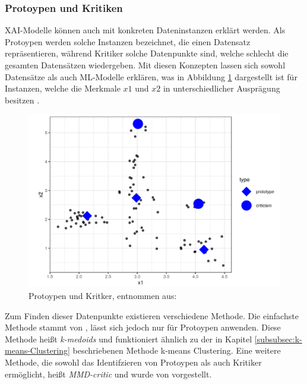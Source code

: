 \subsubsection{Protoypen und Kritiken}
XAI-Modelle können auch mit konkreten Dateninstanzen erklärt werden. Als Protoypen werden solche Instanzen bezeichnet, die einen Datensatz repräsentieren, während Kritiker solche Datenpunkte sind, welche schlecht die gesamten Datensätzen wiedergeben. %
Mit diesen Konzepten lassen sich sowohl Datensätze als auch ML-Modelle erklären, was in Abbildung \ref{Fig:Prototyp_Kritiekr} dargestellt ist für Instanzen, welche die Merkmale $x1$ und $x2$ in unterschiedlicher Ausprägung besitzen \cite{molnar2022}.
\begin{figure}
    \centering
    \includegraphics[scale=0.45]{pic/MA-Bilder/Literaturrecherche/Prototyp_Kritiker-Beispiel.PNG}
    \caption{Protoypen und Kritker, entnommen aus: \cite{molnar2022}}
    \label{Fig:Prototyp_Kritiekr}
\end{figure}
Zum Finden dieser Datenpunkte existieren verschiedene Methode. Die einfachste Methode stammt von \textcite{rdusseeun1987clustering}, lässt sich jedoch nur für Protoypen anwenden. Diese Methode heißt \emph{k-medoids} und funktioniert ähnlich zu der in Kapitel \ref{subsubsec:k-means-Clustering} beschriebenen Methode k-means Clustering. Eine weitere Methode, die sowohl das Identifzieren von Protoypen als auch Kritiker ermöglicht, heißt \emph{MMD-critic} und wurde von \textcite{kim2016examples} vorgestellt. %
